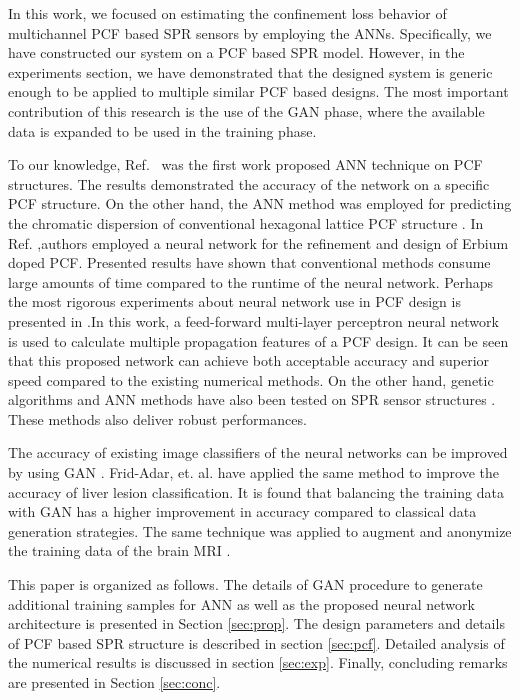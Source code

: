 \documentclass[journal]{IEEEtran}
\begin{document}
In this work, we focused on estimating the confinement loss behavior of multichannel PCF based SPR sensors by employing the ANNs. Specifically, we have constructed our system on a PCF based SPR model. However, in the experiments section, we have demonstrated that the designed system is generic enough to be applied to multiple similar PCF based designs. The most important contribution of this research is the use of the GAN phase, where the available data is expanded to be used in the training phase.

To our knowledge, Ref.~\cite{hameed2008accurate} was the first work proposed ANN technique on PCF structures. The results demonstrated the accuracy of the network on a specific PCF structure. On the other hand, the ANN method was employed for predicting the chromatic dispersion of conventional hexagonal lattice PCF structure \cite{rodriguez2010efficient}. In Ref. \cite{mescia2011refinement},authors employed a neural network for the refinement and design of Erbium doped PCF. Presented results have shown that conventional methods consume large amounts of time compared to the runtime of the neural network. Perhaps the most rigorous experiments about neural network use in PCF design is presented in  \cite{paper0}.In this work, a feed-forward multi-layer perceptron neural network is used to calculate multiple propagation features of a PCF design. It can be seen that this proposed network can achieve both acceptable accuracy and superior speed compared to the existing numerical methods. On the other hand, genetic algorithms and ANN methods have also been tested on SPR sensor structures \cite{fu2018optimization,mcatee2019artificial}. These methods also deliver robust performances.

The accuracy of existing image classifiers of the neural networks can be improved by using GAN  \cite{perez2017effectiveness}. Frid-Adar, et. al. \cite{frid2018synthetic} have applied the same method to improve the accuracy of liver lesion classification. It is found that balancing the training data with GAN has a higher improvement in accuracy compared to classical data generation strategies. The same technique was applied to augment and anonymize the training data of the brain MRI  \cite{shin2018medical}.


This paper is organized as follows. The details of GAN procedure to generate additional training samples for ANN as well as the proposed neural network architecture is presented in Section \ref{sec:prop}. The design parameters and details of PCF based SPR structure is described in section \ref{sec:pcf}. Detailed analysis of the numerical results is discussed in section \ref{sec:exp}. Finally, concluding remarks are presented in Section \ref{sec:conc}.
\end{document}
